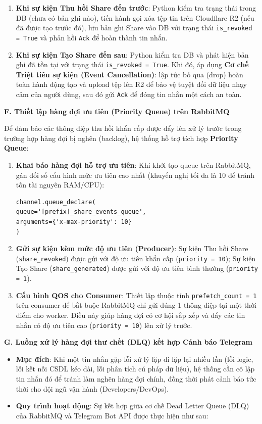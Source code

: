 \begin{enumerate}
\item \textbf{Khi sự kiện Thu hồi Share đến trước}: Python kiểm tra trạng thái trong DB (chưa có bản ghi nào), tiến hành gọi xóa tệp tin trên Cloudflare R2 (nếu đã được tạo trước đó), lưu bản ghi Share vào DB với trạng thái \texttt{is\_revoked = True} và phản hồi \texttt{Ack} để hoàn thành tin nhắn.
\item \textbf{Khi sự kiện Tạo Share đến sau}: Python kiểm tra DB và phát hiện bản ghi đã tồn tại với trạng thái \texttt{is\_revoked = True}. Khi đó, áp dụng \textbf{Cơ chế Triệt tiêu sự kiện (Event Cancellation)}: lập tức bỏ qua (drop) hoàn toàn hành động tạo và upload tệp lên R2 để bảo vệ tuyệt đối dữ liệu nhạy cảm của người dùng, sau đó gửi \texttt{Ack} để đóng tin nhắn một cách an toàn.
\end{enumerate}

\textbf{F. Thiết lập hàng đợi ưu tiên (Priority Queue) trên RabbitMQ}

Để đảm bảo các thông điệp thu hồi khẩn cấp được đẩy lên xử lý trước trong trường hợp hàng đợi bị nghẽn (backlog), hệ thống hỗ trợ tích hợp \textbf{Priority Queue}:
\begin{enumerate}
\item \textbf{Khai báo hàng đợi hỗ trợ ưu tiên}: Khi khởi tạo queue trên RabbitMQ, gán đối số cấu hình mức ưu tiên cao nhất (khuyến nghị tối đa là 10 để tránh tốn tài nguyên RAM/CPU):
\begin{verbatim}
channel.queue_declare(
queue='[prefix]_share_events_queue',
arguments={'x-max-priority': 10}
)
\end{verbatim}
\item \textbf{Gửi sự kiện kèm mức độ ưu tiên (Producer)}: Sự kiện Thu hồi Share (\texttt{share\_revoked}) được gửi với độ ưu tiên khẩn cấp (\texttt{priority = 10}); Sự kiện Tạo Share (\texttt{share\_generated}) được gửi với độ ưu tiên bình thường (\texttt{priority = 1}).
\item \textbf{Cấu hình QOS cho Consumer}: Thiết lập thuộc tính \texttt{prefetch\_count = 1} trên consumer để bắt buộc RabbitMQ chỉ gửi đúng 1 thông điệp tại một thời điểm cho worker. Điều này giúp hàng đợi có cơ hội sắp xếp và đẩy các tin nhắn có độ ưu tiên cao (\texttt{priority = 10}) lên xử lý trước.
\end{enumerate}

\textbf{G. Luồng xử lý hàng đợi thư chết (DLQ) kết hợp Cảnh báo Telegram}
\begin{itemize}
\item \textbf{Mục đích}: Khi một tin nhắn gặp lỗi xử lý lặp đi lặp lại nhiều lần (lỗi logic, lỗi kết nối CSDL kéo dài, lỗi phân tích cú pháp dữ liệu), hệ thống cần cô lập tin nhắn đó để tránh làm nghẽn hàng đợi chính, đồng thời phát cảnh báo tức thời cho đội ngũ vận hành (Developers/DevOps).
\item \textbf{Quy trình hoạt động}: Sự kết hợp giữa cơ chế Dead Letter Queue (DLQ) của RabbitMQ và Telegram Bot API được thực hiện như sau:
\end{itemize}

